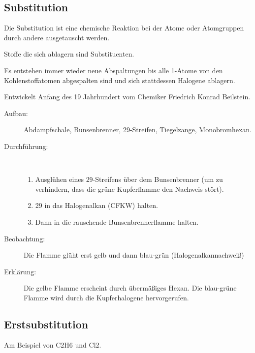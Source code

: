 \subsection{Substitution}
Die Substitution ist eine chemische Reaktion bei der Atome oder Atomgruppen durch andere ausgetauscht
werden.

Stoffe die sich ablagern sind Substituenten.

Es entstehen immer wieder neue Abspaltungen bis alle \ac{1}-Atome von den Kohlenstoffatomen abgespalten
sind und sich stattdessen Halogene ablagern.


Entwickelt Anfang des 19 Jahrhundert vom Chemiker Friedrich Konrad Beilstein.

\begin{description}
	\item[Aufbau:] Abdampfschale, Bunsenbrenner, \ac{29}-Streifen, Tiegelzange, Monobromhexan.
	\item[Durchführung:]~
	\begin{enumerate}
		\item Ausglühen eines \ac{29}-Streifens über dem Bunsenbrenner (um zu verhindern, dass die grüne
			Kupferflamme den Nachweis stört).
		\item \ac{29} in das Halogenalkan (CFKW) halten.
		\item Dann in die rauschende Bunsenbrennerflamme halten.
	\end{enumerate}
	\item[Beobachtung:] Die Flamme glüht erst gelb und dann blau-grün (Halogenalkannachweiß)
	\item[Erklärung:] Die gelbe Flamme erscheint durch übermäßiges Hexan. Die blau-grüne Flamme wird
		durch die Kupferhalogene hervorgerufen.
\end{description}

\subsection{Erstsubstitution}
Am Beispiel von \ac{C2H6} und \ac{Cl2}.

 \chemsign{+} 
\chemsign{\ce{->}}  \chemsign{+}


